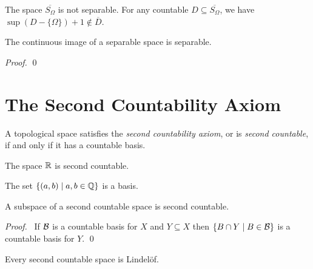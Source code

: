\begin{example}    
    The space $\overline{S_\Omega}$ is not separable. For any countable $D
    \subseteq \overline{S_\Omega}$, we have $\sup (D - \{ \Omega \}) + 1 \notin
    \overline{D}$.
\end{example}

\begin{proposition}
    The continuous image of a separable space is separable.
\end{proposition}

\begin{proof}
    \pf
    \qed
\end{proof}

\section{The Second Countability Axiom}

\begin{definition}
    A topological space satisfies the \emph{second countability axiom},
    or is \emph{second countable}, if and only if it has a countable basis.    
\end{definition}

\begin{example}
    The space $\mathbb{R}$ is second countable.

    The set $\{ (a,b) \mid a,b \in \mathbb{Q} \}$ is a basis.
\end{example}

\begin{proposition}
    \label{proposition:second_countable_subspace}
    A subspace of a second countable space is second countable.
\end{proposition}

\begin{proof}
    \pf\ If $\mathcal{B}$ is a countable basis for $X$ and $Y \subseteq X$
    then $\{ B \cap Y \mid B \in \mathcal{B} \}$ is a countable basis for $Y$. \qed
\end{proof}

\begin{proposition}[CC]
    \label{proposition:lindelof_second_countable}
    Every second countable space is Lindel\"{o}f.
\end{proposition}


